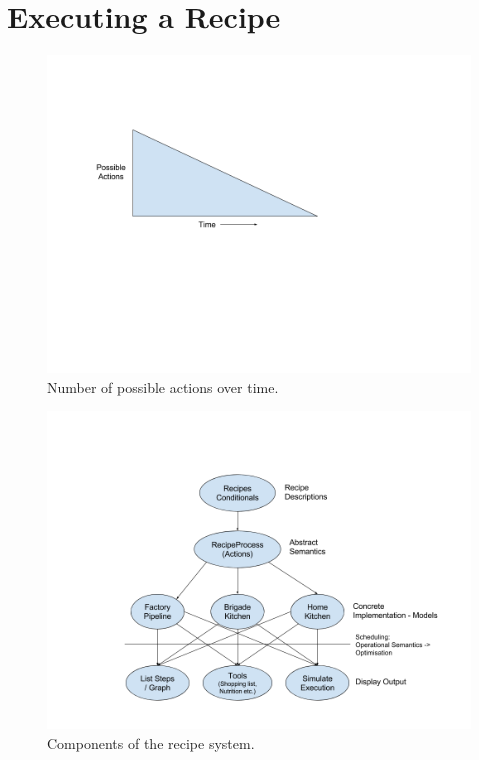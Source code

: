\documentclass[11pt]{article}
\begin{document}
    \section{Executing a Recipe}
    \begin{figure}[ht]
        \centering
            \includegraphics[width=\textwidth,keepaspectratio]{actions_time.png}
        \caption{Number of possible actions over time.}
    \end{figure}

    \begin{figure}[ht]
        \centering
            \includegraphics[width=\textwidth,keepaspectratio]{recipe_flow.png}
        \caption{Components of the recipe system.}
    \end{figure}
\end{document}
